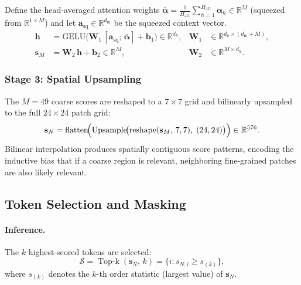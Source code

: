 \documentclass[11pt,a4paper]{article}
\DeclareMathOperator{\TopK}{Top\text{-}k}
\DeclareMathOperator{\Upsample}{Upsample}
\DeclareMathOperator{\reshape}{reshape}
\DeclareMathOperator{\flatten}{flatten}
\newcommand{\R}{\mathbb{R}}
\newcommand{\vs}{\mathbf{s}}
\begin{document}
\begin{mathbox}[title={Spatial Score Computation}]
Define the head-averaged attention weights
$\bar{\boldsymbol{\alpha}} = \frac{1}{H_{\mathrm{att}}}\sum_{h=1}^{H_{\mathrm{att}}}
\boldsymbol{\alpha}_h \in\R^{M}$ (squeezed from $\R^{1\times M}$) and let
$\mathbf{a}_{\mathrm{sq}}\in\R^{d_{\mathrm{m}}}$ be the squeezed context vector.
\begin{align}
  \mathbf{h}
    &= \mathrm{GELU}\!\bigl(
      \mathbf{W}_1\,[\mathbf{a}_{\mathrm{sq}};\,\bar{\boldsymbol{\alpha}}]
      + \mathbf{b}_1
    \bigr) \in\R^{d_h},
  & \mathbf{W}_1 &\in\R^{d_h\times(d_{\mathrm{m}}+M)},
  \label{eq:mlp_hidden} \\[4pt]
  \vs_M
    &= \mathbf{W}_2\,\mathbf{h} + \mathbf{b}_2 \in\R^{M},
  & \mathbf{W}_2 &\in\R^{M\times d_h}.
  \label{eq:mlp_output}
\end{align}
\end{mathbox}

\subsubsection{Stage 3: Spatial Upsampling}
\label{subsubsec:upsample}

The $M{=}49$ coarse scores are reshaped to a $7{\times}7$ grid and bilinearly
upsampled to the full $24{\times}24$ patch grid:
\begin{equation}
  \vs_N = \flatten\!\Bigl(
    \Upsample\!\bigl(\reshape(\vs_M,\,7,7),\;(24,24)\bigr)
  \Bigr) \in\R^{576}.
  \label{eq:upsample}
\end{equation}
Bilinear interpolation produces spatially contiguous score patterns, encoding
the inductive bias that if a coarse region is relevant, neighboring fine-grained
patches are also likely relevant.

\subsection{Token Selection and Masking}
\label{subsec:masking}

\paragraph{Inference.} The $k$ highest-scored tokens are selected:
\begin{equation}
  \mathcal{S} = \TopK(\vs_N,\,k)
  = \bigl\{i : s_{N,i} \geq s_{(k)}\bigr\},
  \label{eq:topk}
\end{equation}
where $s_{(k)}$ denotes the $k$-th order statistic (largest value) of $\vs_N$.
\end{document}
